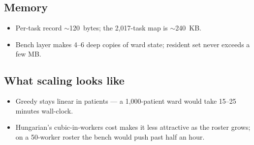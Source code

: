 \subsection{Memory}

\begin{itemize}
  \item Per-task record $\sim$120~bytes; the 2{,}017-task map is
        $\sim$240~KB.
  \item Bench layer makes 4--6 deep copies of ward state; resident
        set never exceeds a few MB.
\end{itemize}

\subsection{What scaling looks like}

\begin{itemize}
  \item Greedy stays linear in patients --- a 1{,}000-patient ward
        would take 15--25 minutes wall-clock.
  \item Hungarian's cubic-in-workers cost makes it less attractive
        as the roster grows; on a 50-worker roster the bench would
        push past half an hour.
\end{itemize}

